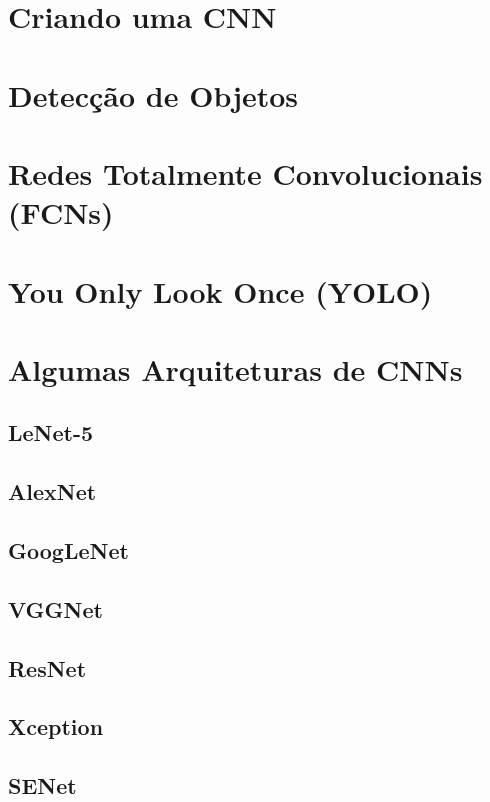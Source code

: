 \section{Criando uma CNN}

\section{Detecção de Objetos}

\section{Redes Totalmente Convolucionais (FCNs)}

\section{You Only Look Once (YOLO)}

\section{Algumas Arquiteturas de CNNs}

\subsection{LeNet-5}

\subsection{AlexNet}

\subsection{GoogLeNet}

\subsection{VGGNet}

\subsection{ResNet}

\subsection{Xception}

\subsection{SENet}